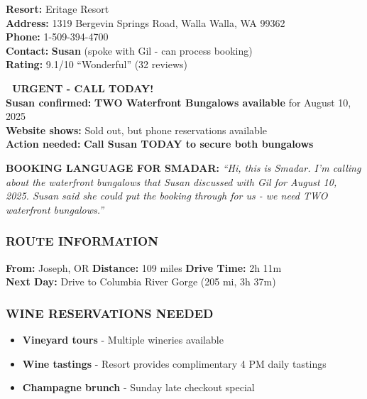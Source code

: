 \documentclass[
  10pt,
]{article}
\providecommand{\tightlist}{%
  \setlength{\itemsep}{0pt}\setlength{\parskip}{0pt}}
\begin{document}
\textbf{\textcolor{secondary}{Resort:}} Eritage Resort\\
\textbf{\textcolor{secondary}{Address:}} 1319 Bergevin Springs Road,
Walla Walla, WA 99362\\
\textbf{\textcolor{secondary}{Phone:}}
\textcolor{primary}{1-509-394-4700}\\
\textbf{\textcolor{secondary}{Contact:}} \textbf{Susan} (spoke with Gil
- can process booking)\\
\textbf{\textcolor{secondary}{Rating:}} 9.1/10 ``Wonderful'' (32
reviews)

\textbf{\textcolor{primary}{🚨 URGENT - CALL TODAY!}}\\
\textbf{\textcolor{secondary}{Susan confirmed:}} \textbf{TWO Waterfront
Bungalows available} for August 10, 2025\\
\textbf{\textcolor{secondary}{Website shows:}} Sold out, but phone
reservations available\\
\textbf{\textcolor{secondary}{Action needed:}} \textbf{Call Susan TODAY
to secure both bungalows}

\textbf{\textcolor{primary}{BOOKING LANGUAGE FOR SMADAR:}} \emph{``Hi,
this is Smadar. I'm calling about the waterfront bungalows that Susan
discussed with Gil for August 10, 2025. Susan said she could put the
booking through for us - we need TWO waterfront bungalows.''}

\subsubsection{\texorpdfstring{\textcolor{primary}{ROUTE INFORMATION}}{}}\label{section-35}

\textbf{\textcolor{secondary}{From:}} Joseph, OR \textbar{}
\textbf{\textcolor{secondary}{Distance:}} 109 miles \textbar{}
\textbf{\textcolor{secondary}{Drive Time:}} 2h 11m\\
\textbf{\textcolor{secondary}{Next Day:}} Drive to Columbia River Gorge
(205 mi, 3h 37m)

\subsubsection{\texorpdfstring{\textcolor{primary}{WINE RESERVATIONS NEEDED}}{}}\label{section-36}

\begin{itemize}
\tightlist
\item
  \textbf{\textcolor{secondary}{Vineyard tours}} - Multiple wineries
  available
\item
  \textbf{\textcolor{secondary}{Wine tastings}} - Resort provides
  complimentary 4 PM daily tastings\\
\item
  \textbf{\textcolor{secondary}{Champagne brunch}} - Sunday late
  checkout special
\end{itemize}
\end{document}
